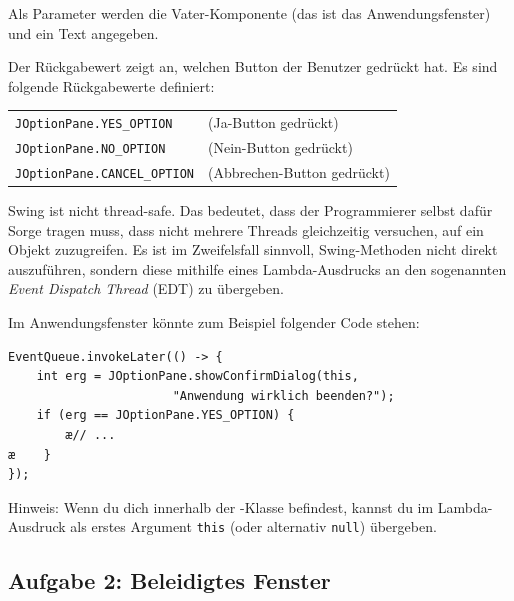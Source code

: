Als Parameter werden die Vater-Komponente (das ist das Anwendungsfenster) und
ein Text angegeben.

Der Rückgabewert zeigt an, welchen Button der Benutzer gedrückt hat. Es sind
folgende Rückgabewerte definiert:

\medskip
\bgroup
\def\arraystretch{1.2}
\begin{tabular}{ll}
\lstinline|JOptionPane.YES_OPTION| \hspace{15mm} &
(Ja-Button gedrückt)
\\
\lstinline|JOptionPane.NO_OPTION| \hspace{15mm} &
(Nein-Button gedrückt)
\\
\lstinline|JOptionPane.CANCEL_OPTION| \hspace{15mm} &
(Abbrechen-Button gedrückt)
\\
\end{tabular}
\egroup

\medskip
Swing ist nicht thread-safe. Das bedeutet, dass der Programmierer selbst dafür
Sorge tragen muss, dass nicht mehrere Threads gleichzeitig versuchen, auf ein
Objekt zuzugreifen. Es ist im Zweifelsfall sinnvoll, Swing-Methoden nicht
direkt auszuführen, sondern diese mithilfe eines Lambda-Ausdrucks an den
sogenannten \emph{Event Dispatch Thread} (EDT) zu übergeben.

Im Anwendungsfenster könnte zum Beispiel folgender Code stehen:

\begin{lstlisting}
EventQueue.invokeLater(() -> {
    int erg = JOptionPane.showConfirmDialog(this, 
                       "Anwendung wirklich beenden?");
    if (erg == JOptionPane.YES_OPTION) {
        æ// ...
æ    }
});
\end{lstlisting}

Hinweis: Wenn du dich innerhalb der -Klasse befindest, kannst
du im Lambda-Ausdruck als erstes Argument \lstinline|this| (oder alternativ
\lstinline|null|) übergeben.


\subsection{Aufgabe 2: Beleidigtes Fenster}

